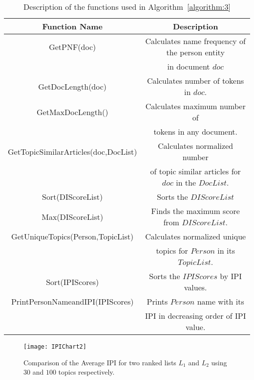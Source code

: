 \begin{table*}
\begin{center}
\begin{tabular}{|c|c|} \hline
Function Name & Description \\ \hline
GetPNF(doc) & Calculates name frequency of the person entity \\
 & in document $doc$ \\ \hline
GetDocLength(doc) & Calculates number of tokens in $doc$. \\ \hline
GetMaxDocLength() & Calculates maximum number of \\
& tokens in any document.\\ \hline
GetTopicSimilarArticles(doc,DocList) &  Calculates normalized number \\
& of topic similar articles for $doc$ in the $DocList$. \\ \hline
Sort(DIScoreList) & Sorts the $DIScoreList$ \\ \hline
Max(DIScoreList) & Finds the maximum score from $DIScoreList$. \\ \hline
GetUniqueTopics(Person,TopicList) & Calculates normalized unique \\
& topics for $Person$ in its $TopicList$. \\ \hline
Sort(IPIScores) & Sorts the $IPIScores$ by IPI values. \\ \hline
PrintPersonNameandIPI(IPIScores) & Prints $Person$ name with its \\
& IPI in decreasing order of IPI value. \\ \hline
\end{tabular}
\caption{Description of the functions used in Algorithm~\ref{algorithm:3}}
\label{default}
\end{center}
\vspace{-10pt}
\end{table*}%

\begin{figure}
\begin{center}
\texttt{[image: IPIChart2]}
\end{center}
\caption{Comparison of the Average IPI for two ranked lists $L_1$ and $L_2$ using $30$ and $100$ topics respectively.}
\label{figure:IPI}
\vspace{-10pt}
\end{figure}